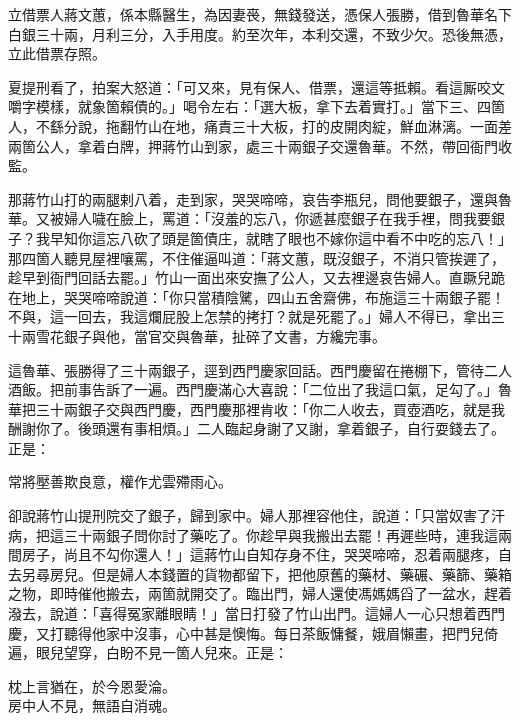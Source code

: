 \begin{myquote}[\markfont]
立借票人蔣文蕙，係本縣醫生，為因妻䘮，無錢發送，憑保人張勝，借到魯華名下白銀三十兩，月利三分，入手用度。約至次年，本利交還，不致少欠。恐後無憑，立此借票存照。
\end{myquote}

夏提刑看了，拍案大怒道：「可又來，見有保人、借票，還這等抵賴。看這厮咬文嚼字模樣，就象箇賴債的。」{}喝令左右：「選大板，拿下去着實打。」當下三、四箇人，不繇分說，拖翻竹山在地，痛責三十大板，打的皮開肉綻，鮮血淋漓。一面差兩箇公人，拿着白牌，押蔣竹山到家，處三十兩銀子交還魯華。不然，帶回衙門收監。

那蔣竹山打的兩腿剌八着，走到家，哭哭啼啼，哀告李瓶兒，問他要銀子，還與魯華。又被婦人噦在臉上，罵道：「沒羞的忘八，你遞甚麼銀子在我手裡，問我要銀子？我早知你這忘八砍了頭是箇債庄，就瞎了眼也不嫁你這中看不中吃的忘八！」那四箇人聽見屋裡嚷罵，不住催逼叫道：「蔣文蕙，既沒銀子，不消只管挨遲了，趁早到衙門回話去罷。」竹山一面出來安撫了公人，又去裡邊哀告婦人。直蹶兒跪在地上，{}哭哭啼啼說道：「你只當積陰騭，四山五舍齋佛，布施這三十兩銀子罷！不與，這一回去，我這爛屁股上怎禁的拷打？就是死罷了。」婦人不得已，拿出三十兩雪花銀子與他，{}當官交與魯華，扯碎了文書，方纔完事。

這魯華、張勝得了三十兩銀子，逕到西門慶家回話。西門慶留在捲棚下，管待二人酒飯。把前事告訴了一遍。西門慶滿心大喜說：「二位出了我這口氣，足勾了。」魯華把三十兩銀子交與西門慶，西門慶那裡肯收：「你二人收去，買壺酒吃，就是我酬謝你了。後頭還有事相煩。」二人臨起身謝了又謝，拿着銀子，自行耍錢去了。正是：

\begin{myquote} 
常將壓善欺良意，權作尤雲殢雨心。
\end{myquote} 

卻說蔣竹山提刑院交了銀子，歸到家中。婦人那裡容他住，說道：「只當奴害了汗病，把這三十兩銀子問你討了藥吃了。你趁早與我搬出去罷！再遲些時，連我這兩間房子，尚且不勾你還人！」這蔣竹山自知存身不住，{}哭哭啼啼，忍着兩腿疼，自去另尋房兒。但是婦人本錢置的貨物都留下，{}把他原舊的藥材、藥碾、藥篩、藥箱之物，即時催他搬去，兩箇就開交了。臨出門，婦人還使馮媽媽舀了一盆水，趕着潑去，說道：「喜得冤家離眼睛！」當日打發了竹山出門。這婦人一心只想着西門慶，又打聽得他家中沒事，心中甚是懊悔。{}每日茶飯慵餐，娥眉懶畫，把門兒倚遍，眼兒望穿，白盼不見一箇人兒來。正是：

\begin{myquote} 
枕上言猶在，於今恩愛淪。\\房中人不見，無語自消魂。
\end{myquote} 

